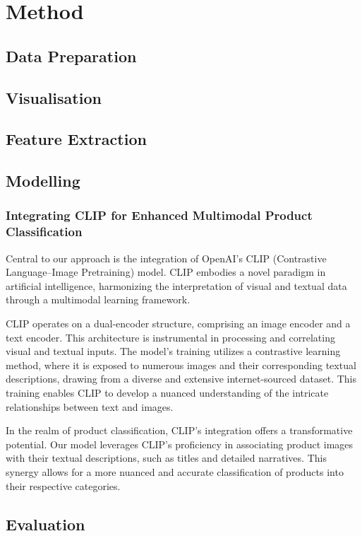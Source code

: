 \section{Method}
\label{sec:method}

\subsection{Data Preparation}

\subsection{Visualisation}

\subsection{Feature Extraction}

\subsection{Modelling}

\subsubsection{Integrating CLIP for Enhanced Multimodal Product Classification}
Central to our approach is the integration of OpenAI's CLIP (Contrastive Language–Image Pretraining) model. CLIP embodies a novel paradigm in artificial intelligence, harmonizing the interpretation of visual and textual data through a multimodal learning framework.

CLIP operates on a dual-encoder structure, comprising an image encoder and a text encoder. This architecture is instrumental in processing and correlating visual and textual inputs. The model's training utilizes a contrastive learning method, where it is exposed to numerous images and their corresponding textual descriptions, drawing from a diverse and extensive internet-sourced dataset. This training enables CLIP to develop a nuanced understanding of the intricate relationships between text and images.

In the realm of product classification, CLIP's integration offers a transformative potential. Our model leverages CLIP's proficiency in associating product images with their textual descriptions, such as titles and detailed narratives. This synergy allows for a more nuanced and accurate classification of products into their respective categories.


\subsection{Evaluation}
